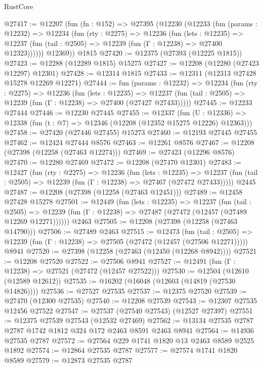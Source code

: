 \begin{lexlean}{RustCore}
\begin{coremodule}
@27417 := @12207
    (fun (fn : @152) =>
    @27395
      (@12230
        (@12233
          (fun (params : @12232) =>
          @12234
            (fun (rty : @2275) =>
            @12236
              (fun (lets : @12235) =>
              @12237 (fun (tail : @2505) => @12239 (fun (Γ : @12238) => @27400 @12323))))))
        @12369))
    @1815
@27420 := @12375 (@27393 (@12225 @1815))
@27423 := @12288 (@12289 @1815) @15275
@27427 := @12208 (@12280 (@27423 @12297) @12301)
@27428 := @12314 @1815
@27433 := @12311 (@12313 @27428 @15278 @12269 @12271)
@27444 := fun (params : @12232) =>
  @12234
    (fun (rty : @2275) =>
    @12236
      (fun (lets : @12235) =>
      @12237 (fun (tail : @2505) => @12239 (fun (Γ : @12238) => @27400 (@27427 @27433)))))
@27445 := @12233 @27444
@27446 := @12230 @27445
@27455 := @12337
    (fun (U : @12336) => @12338 (fun (t : @7) => @12346 (@12208 (@12352 @15275 @12226) @12363)))
@27458 := @27420 (@27446 @27455) @15273
@27460 := @12193 @27445 @27455
@27462 := @12424 @27444 @8576
@27463 := @12261 @8576
@27467 := @12208 (@27398 (@12258 (@27463 @12274)))
@27469 := @27423 (@12296 @8576)
@27470 := @12280 @27469
@27472 := @12208 (@27470 @12301)
@27483 := @12427
    (fun (rty : @2275) =>
    @12236
      (fun (lets : @12235) =>
      @12237 (fun (tail : @2505) => @12239 (fun (Γ : @12238) => @27467 (@27472 @27433)))))
    @2445
@27487 := @12208 (@27398 (@12258 (@27463 @12451)))
@27489 := @12458 @27428 @15278
@27501 := @12449
    (fun (lets : @12235) =>
    @12237
      (fun (tail : @2505) =>
      @12239 (fun (Γ : @12238) => @27487 (@27472 (@12457 (@27489 @12269 @12271))))))
    @2463
@27505 := @12208 (@27398 (@12258 (@27463 @14790)))
@27506 := @27489 @2463
@27515 := @12473
    (fun (tail : @2505) => @12239 (fun (Γ : @12238) => @27505 (@27472 (@12457 (@27506 @12271)))))
    @8941
@27520 := @27398 (@12258 (@27463 (@12450 (@12268 @8942))))
@27521 := @12208 @27520
@27522 := @27506 @8941
@27527 := @12491 (fun (Γ : @12238) => @27521 (@27472 (@12457 @27522)))
@27530 := @12504 (@12610 (@12589 @12612))
@27535 := @16202 (@16048 (@12603 (@14819 (@27530 @14826))))
@27536 := @27527 @27535
@27537 := @12375 @27520
@27539 := @27470 (@12300 @27535)
@27540 := @12208 @27539
@27543 := @12307 @27535 @12456 @27522
@27547 := @27537 (@27540 @27543) (@12527 @27397)
@27551 := @12375 @27539 @27543 (@12532 @27469)
@27562 := @13134 @27535 @2787 @2787 @1742 @1812 @324 @172 @2463 @8591 @2463 @8941
@27564 := @14936 @27535 @2787
@27572 := @27564 @229 @1741 @1820 @13 @2463 @8589 @2525 @1892
@27574 := @12864 @27535 @2787
@27577 := @27574 @1741 @1820 @8589
@27579 := @12873 @27535 @2787

\end{coremodule}
\end{lexlean}
